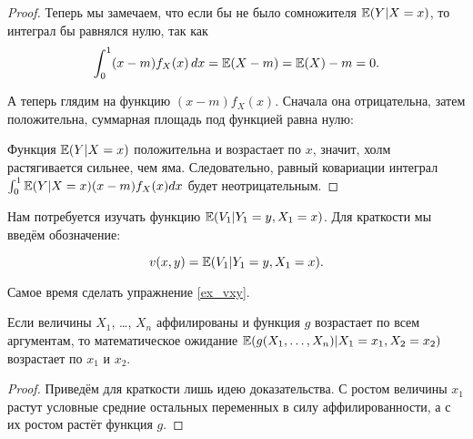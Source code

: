 \begin{proof}
Теперь мы замечаем, что если бы не было сомножителя $ \operatorname{\mathbb{E}}(Y|X=x) $, то ин\-тег\-рал бы равнялся нулю, так как
\begin{equation}
\int_{0}^{1}(x-m)f_{X}(x) \, dx=\operatorname{\mathbb{E}}(X-m)=\operatorname{\mathbb{E}}(X)-m=0.
\end{equation}

А теперь глядим на функцию $ (x-m)f_{X}(x) $. Сначала она отрицательна, затем положительна, суммарная площадь под функцией равна нулю:


Функция $ \operatorname{\mathbb{E}}(Y|X=x) $ положительна и возрастает по $ x $, значит, холм растягивается сильнее, чем яма. Следовательно, равный ковариации интеграл $ \int_{0}^{1}\operatorname{\mathbb{E}}(Y|X=x)(x-m)f_{X}(x)dx $ будет неотрицательным.


\end{proof}



Нам потребуется изучать функцию $ \operatorname{\mathbb{E}}(V_{1}|Y_{1}=y, X_{1}=x) $.  Для краткости мы введём обозначение:

\begin{mydef}
\begin{equation}
v(x,y)=\operatorname{\mathbb{E}}(V_{1}|Y_{1}=y, X_{1}=x).
\end{equation}
\end{mydef}

Самое время сделать упражнение \ref{ex_vxy}.

\begin{myth}
\label{aff_multi_f}
Если величины $ X_{1} $, \ldots, $ X_{n} $ аффилированы и функция $g$ возрастает по всем аргументам, то математическое ожидание $\operatorname{\mathbb{E}}(g(X_{1},\ldots,X_{n})|X_{1}=x_{1},X_{2}=x_{2}) $ возрастает по $ x_{1} $ и $ x_{2} $.
\end{myth}

\begin{proof}
Приведём для краткости лишь идею доказательства. С ростом величины $ x_{1} $ растут условные средние остальных переменных в силу аффилированности, а с их ростом растёт функция $ g $.
\end{proof}

